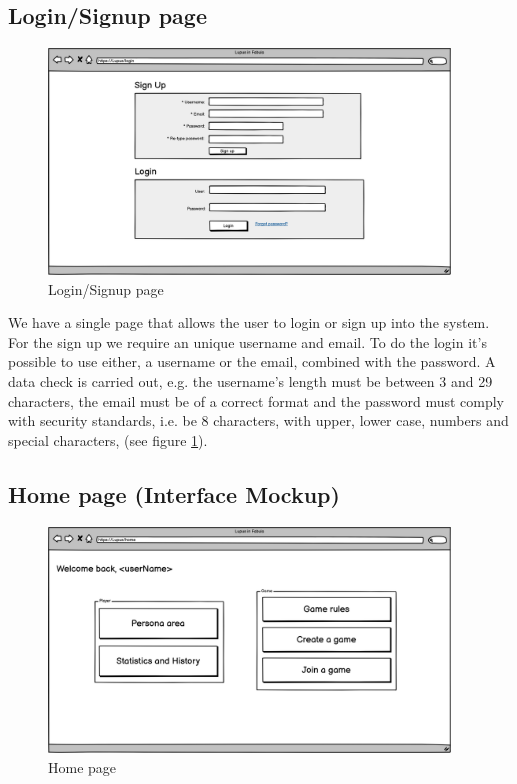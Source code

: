 \subsection{Login/Signup page}
\begin{figure}[h!] 
    \centering
    \includegraphics[height=6cm]{images/Page/Login_singup.png}
    \caption{Login/Signup page}
    \label{fig:Login_singup_page}
\end{figure}

We have a single page that allows the user to login or sign up into the system.
For the sign up we require an unique username and email. To do the login it's possible to use either, a username or the email, combined with the password.
A data check is carried out, e.g. the username's length must be between 3 and 29 characters, the email must be of a correct format and the password must comply with security standards, i.e. be 8 characters, with upper, lower case, numbers and special characters, (see figure \ref{fig:Login_singup_page}).

\subsection{Home page (Interface Mockup)}
\begin{figure}[h!] 
    \centering
    \includegraphics[height=6cm]{images/Page/Home.png}
    \caption{Home page}
    \label{fig:home_page}

\end{figure}

